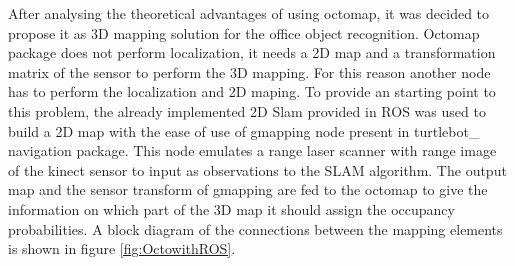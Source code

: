 \documentclass[fontsize=12pt]{article}
\begin{document}
After analysing the theoretical advantages of using octomap, it was decided to propose it as 3D mapping solution for the office object recognition. 
Octomap package does not perform localization, it needs a 2D map and a transformation matrix of the sensor to perform the 3D mapping. For this reason another node has to perform the localization and 2D maping. To provide an starting point to this problem, the already implemented 2D Slam provided in ROS was used to build a 2D map with the ease of use of gmapping node present in turtlebot\_ navigation package. This node emulates a range laser scanner with range image of the kinect sensor to input as observations to the SLAM algorithm. The output map and the sensor transform of gmapping are fed to the octomap to give the information on which part of the 3D map it should assign the occupancy probabilities. A block diagram of the connections between the mapping elements is shown in figure \ref{fig:OctowithROS}.
\end{document}
